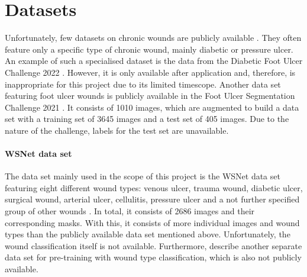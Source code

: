 \section{Datasets}\label{sec:data-sets}

Unfortunately, few datasets on chronic wounds are publicly available \cite{Oota_2023_WACV}. They often feature only a specific type of chronic wound, mainly diabetic or pressure ulcer. An example of such a specialised dataset is the data from the Diabetic Foot Ulcer Challenge 2022 \cite{DFUC2022}. However, it is only available after application and, therefore, is inappropriate for this project due to its limited timescope. Another data set featuring foot ulcer wounds is publicly available in the Foot Ulcer Segmentation Challenge 2021 \cite{Wang2020}. It consists of 1010 images, which are augmented to build a data set with a training set of 3645 images and a test set of 405 images. Due to the nature of the challenge, labels for the test set are unavailable.

\paragraph{WSNet data set} The data set mainly used in the scope of this project is the WSNet data set featuring eight different wound types: venous ulcer, trauma wound, diabetic ulcer, surgical wound, arterial ulcer, cellulitis, pressure ulcer and a not further specified group of other wounds \cite{Oota_2023_WACV, Oota_2021_WACV}. In total, it consists of 2686 images and their corresponding masks. With this, it consists of more individual images and wound types than the publicly available data set mentioned above. Unfortunately, the wound classification itself is not available. Furthermore, \citeauthor{Oota_2023_WACV} describe another separate data set for pre-training with wound type classification, which is also not publicly available.
